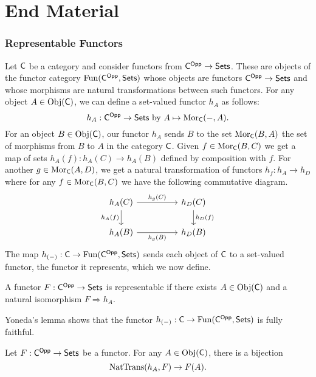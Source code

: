 \part*{End Material}
\appendix
\section{Representable Functors}\label{sec: representable functors}
Let $\mathsf{C}$ be a category and consider functors from $\mathsf{C}^{\mathsf{Opp}}\to\mathsf{Sets}$. These are objects of the functor category $\mathrm{Fun}(\mathsf{C}^{\mathsf{Opp}},\mathsf{Sets})$ whose objects are functors $\mathsf{C}^{\mathsf{Opp}}\to\mathsf{Sets}$ and whose morphisms are natural transformations between such functors. For any object $A\in\mathrm{Obj}(\mathsf{C})$, we can define a set-valued functor $h_{A}$ as follows:
$$h_{A}:\mathsf{C}^{\mathsf{Opp}}\to\mathsf{Sets} \text{ by }A\mapsto\mathrm{Mor}_{\mathsf{C}}(-,A).$$
For an object $B\in\mathrm{Obj}(\mathsf{C})$, our functor $h_{A}$ sends $B$ to the set $\mathrm{Mor}_{\mathsf{C}}(B,A)$ the set of morphisms from $B$ to $A$ in the category $\mathsf{C}$. Given $f\in\mathrm{Mor}_{\mathsf{C}}(B,C)$ we get a map of sets $h_{A}(f):h_{A}(C)\to h_{A}(B)$ defined by composition with $f$. For another $g\in \mathrm{Mor}_{\mathsf{C}}(A,D)$, we get a natural transformation of functors $h_{f}:h_{A}\to h_{D}$ where for any $f\in\mathrm{Mor}_{\mathsf{C}}(B,C)$ we have the following commutative diagram. 
$$%
\begin{tikzcd}
	{h_{A}(C)} && {h_{D}(C)} \\
	{h_{A}(B)} && {h_{D}(B)}
	\arrow["{h_{g}(B)}"', from=2-1, to=2-3]
	\arrow["{h_{D}(f)}", from=1-3, to=2-3]
	\arrow["{h_{A}(f)}"', from=1-1, to=2-1]
	\arrow["{h_{g}(C)}", from=1-1, to=1-3]
\end{tikzcd}$$
The map $h_{(-)}:\mathsf{C}\to\mathrm{Fun}(\mathsf{C}^{\mathsf{Opp}},\mathsf{Sets})$ sends each object of $\mathsf{C}$ to a set-valued functor, the functor it represents, which we now define. 
\begin{definition}\label{def: representable functor}
    A functor $F:\mathsf{C}^{\mathsf{Opp}}\to\mathsf{Sets}$ is representable if there exists $A\in\mathrm{Obj}(\mathsf{C})$ and a natural isomorphism $F\Longrightarrow h_{A}$. 
\end{definition}
Yoneda's lemma shows that the functor $h_{(-)}:\mathsf{C}\to\mathrm{Fun}(\mathsf{C}^{\mathsf{Opp}},\mathsf{Sets})$ is fully faithful.
\begin{lemma}[Yoneda]\label{lem: Yoneda}
    Let $F:\mathsf{C}^{\mathsf{Opp}}\to\mathsf{Sets}$ be a functor. For any $A\in\mathrm{Obj}(\mathsf{C})$, there is a bijection 
    $$\mathrm{NatTrans}(h_{A},F)\to F(A).$$
\end{lemma}
